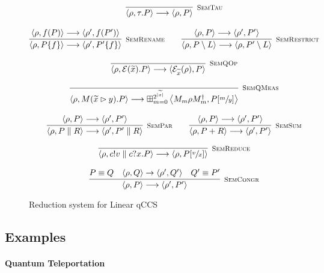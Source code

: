 \begin{figure}[h!]
\caption{Reduction system for Linear qCCS}
\label{reduction}
  \begin{gather*}
    \infer[\mbox{\footnotesize\scshape SemTau}]{\langle \rho, \tau . P \rangle \longrightarrow \langle \rho, P \rangle}{} \\[0.3cm]
    \infer[\mbox{\footnotesize\scshape SemRename}]{\langle \rho, P \{f\} \rangle \longrightarrow \langle \rho', P' \{f\}\rangle}{\langle \rho, f(P) \rangle \longrightarrow \langle \rho', f(P') \rangle} \qquad
    \infer[\mbox{\footnotesize\scshape SemRestrict}]{\langle \rho, P \setminus L \rangle \longrightarrow \langle \rho, P' \setminus L \rangle}{\langle \rho, P \rangle \longrightarrow \langle \rho', P' \rangle} \\[0.3cm]
    \infer[\mbox{\footnotesize\scshape SemQOp}]{\langle \rho, \mathcal{E}(\widetilde{x}) . P \rangle \longrightarrow \langle \mathcal{E}_{\widetilde{x}}(\rho), P \rangle}{} \\[0.3cm]
    \infer[\mbox{\footnotesize\scshape SemQMeas}]{\langle \rho, M(\widetilde{x} \rhd y) . P \rangle \longrightarrow \boxplus_{m = 0}^{2^{|\widetilde{x}|}} \left\langle {M_m \rho M_m^\dag}, P[\sfrac{m}{y}] \right\rangle}{} \\[0.3cm]
    \infer[\mbox{\footnotesize\scshape SemPar}]{\langle \rho, P \parallel R \rangle \longrightarrow \langle \rho', P' \parallel R \rangle}{\langle \rho, P \rangle \longrightarrow \langle \rho', P' \rangle} \qquad
    \infer[\mbox{\footnotesize\scshape SemSum}]{\langle \rho, P + R \rangle \longrightarrow \langle \rho', P' \rangle}{\langle \rho, P \rangle \longrightarrow \langle \rho', P' \rangle} \\[0.3cm]
    \infer[\mbox{\footnotesize\scshape SemReduce}]{\langle \rho, c!v \parallel c?x . P \rangle \longrightarrow \langle \rho, P[\sfrac{v}{x}] \rangle}{} \\[0.3cm]
    \infer[\mbox{\footnotesize\scshape SemCongr}]{\langle \rho, P \rangle \longrightarrow \langle \rho', P' \rangle}
    {P \equiv Q & \confw{\rho, Q} \rightarrow \confw{\rho', Q'} & Q' \equiv P'}
  \end{gather*}
\end{figure}
  
\subsection{Examples}
  \paragraph{Quantum Teleportation}

